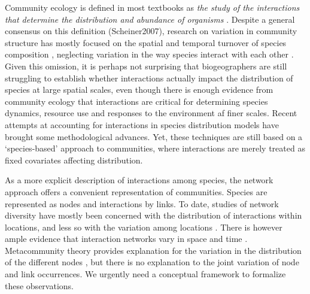 \documentclass[12pt]{article}
\begin{document}
Community ecology is defined in most textbooks as \textit{the study of the
interactions that determine the distribution and abundance of organisms}
\citep{Krebs2001}. Despite a general consensus on this definition
(Scheiner2007), research on variation in community
structure has mostly focused on the spatial and temporal turnover of species composition
\citep{Anderson2011}, neglecting variation in the way species interact with
each other \citep{Poisot2015a}. Given this omission, it is perhaps not
surprising that biogeographers are still struggling to establish whether
interactions actually impact the distribution of species at large spatial
scales\citep{Wisz2012, Kissling2012}, even though there is enough evidence
from community ecology that interactions are critical for determining species
dynamics, resource use and responses to the environment af finer scales.
Recent attempts at accounting for interactions in species distribution models
\citep{Pollock2014, Pelissier2013} have brought some methodological advances.
Yet, these techniques are still based on a `species-based' approach to
communities, where interactions are merely treated as fixed covariates
affecting distribution.

As a more explicit description of interactions among species, the
network approach offers a convenient representation of communities. Species
are represented as nodes and interactions by links. To date, studies of
network diversity have mostly been concerned with the distribution of
interactions within locations, and less so with the variation among locations
\citep{Dunne2005, Bascompte2007, Ings2007, Kefi2012}. There is however 
ample evidence that interaction networks vary in space and time
\citep{Laliberté2010, Poisot2012, Albouy2014, Poisot2016, Trojelsgaard2015}. Metacommunity
theory provides explanation for the variation in the distribution of the
different nodes \citep{Gravel2011c, Pillai2011}, but there is no explanation
to the joint variation of node and link occurrences. We urgently need a
conceptual framework to formalize these observations.
\end{document}
